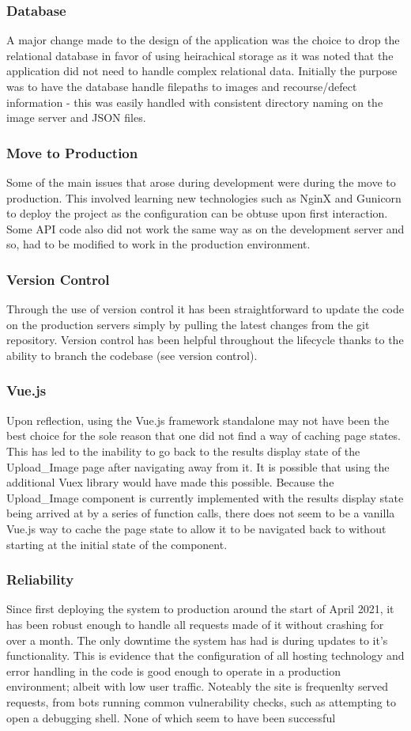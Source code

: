 \subsubsection{Database}
  A major change made to the design of the application was the choice to drop the relational database in favor of using heirachical storage as it was noted that the application did not need to handle complex relational data. Initially the purpose was to have the database handle filepaths to images and recourse/defect information - this was easily handled with consistent directory naming on the image server and JSON files.
\subsubsection{Move to Production}
  Some of the main issues that arose during development were during the move to production. This involved learning new technologies such as NginX and Gunicorn to deploy the project as the configuration can be obtuse upon first interaction. Some API code also did not work the same way as on the development server and so, had to be modified to work in the production environment.
\subsubsection{Version Control}
  Through the use of version control it has been straightforward to update the code on the production servers simply by pulling the latest changes from the git repository. Version control has been helpful throughout the lifecycle thanks to the ability to branch the codebase (see version control).
\subsubsection{Vue.js}
  Upon reflection, using the Vue.js framework standalone may not have been the best choice for the sole reason that one did not find a way of caching page states. This has led to the inability to go back to the results display state of the Upload\_Image page after navigating away from it. It is possible that using the additional Vuex library would have made this possible. Because the Upload\_Image component is currently implemented with the results display state being arrived at by a series of function calls, there does not seem to be a vanilla Vue.js way to cache the page state to allow it to be navigated back to without starting at the initial state of the component.
\subsubsection{Reliability}
  Since first deploying the system to production around the start of April 2021, it has been robust enough to handle all requests made of it without crashing for over a month. The only downtime the system has had is during updates to it's functionality. This is evidence that the configuration of all hosting technology and error handling in the code is good enough to operate in a production environment; albeit with low user traffic. Noteably the site is frequenlty served requests, from bots running common vulnerability checks, such as attempting to open a debugging shell. None of which seem to have been successful
